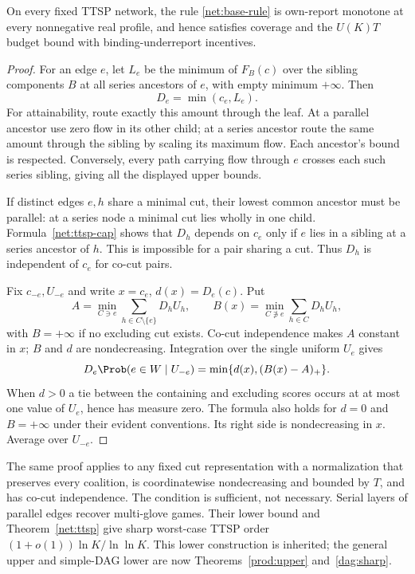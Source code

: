 \begin{theorem}\label{net:ttsp}
On every fixed TTSP network, the rule \eqref{net:base-rule} is own-report
monotone at every nonnegative real profile, and hence satisfies coverage and
the $U(K)T$ budget bound with binding-underreport incentives.
\end{theorem}
\begin{proof}
For an edge $e$, let $L_e$ be the minimum of $F_B(c)$ over the sibling
components $B$ at all series ancestors of $e$, with empty minimum $+\infty$.
Then
\begin{equation}\label{net:ttsp-cap}
 D_e=\min(c_e,L_e).
\end{equation}
For attainability, route exactly this amount through the leaf.  At a parallel
ancestor use zero flow in its other child; at a series ancestor route the same
amount through the sibling by scaling its maximum flow.  Each ancestor's
bound is respected.  Conversely, every path carrying flow through $e$ crosses
each such series sibling, giving all the displayed upper bounds.

If distinct edges $e,h$ share a minimal cut, their lowest common ancestor
must be parallel: at a series node a minimal cut lies wholly in one child.
Formula~\eqref{net:ttsp-cap} shows that $D_h$ depends on $c_e$ only if $e$
lies in a sibling at a series ancestor of $h$.  This is impossible for a pair
sharing a cut.  Thus $D_h$ is independent of $c_e$ for co-cut pairs.

Fix $c_{-e},U_{-e}$ and write $x=c_e$, $d(x)=D_e(c)$.  Put
\[
 A=\min_{C\ni e}\sum_{h\in C\setminus\{e\}}D_hU_h,\qquad
 B(x)=\min_{C\not\ni e}\sum_{h\in C}D_hU_h,
\]
with $B=+\infty$ if no excluding cut exists.
Co-cut independence makes $A$ constant in $x$; $B$ and $d$ are nondecreasing.
Integration over the single uniform $U_e$ gives
\begin{equation}\label{net:conditional}
 D_e\Prob(e\in W\mid U_{-e})=\min\{d(x),(B(x)-A)_+\}.
\end{equation}
When $d>0$ a tie between the containing and excluding scores occurs at at
most one value of $U_e$, hence has measure zero.  The formula also holds for
$d=0$ and $B=+\infty$ under their evident conventions.
Its right side is nondecreasing in $x$.  Average over $U_{-e}$.
\end{proof}
The same proof applies to any fixed cut representation with a normalization
that preserves every coalition, is coordinatewise nondecreasing and bounded
by $T$, and has co-cut independence.  The condition is sufficient, not necessary.
Serial layers of parallel edges recover multi-glove games.  Their lower
bound and Theorem~\ref{net:ttsp} give sharp worst-case TTSP order
$(1+o(1))\ln K/\ln\ln K$.  This lower construction is inherited; the general
upper and simple-DAG lower are now Theorems~\ref{prod:upper} and~\ref{dag:sharp}.

